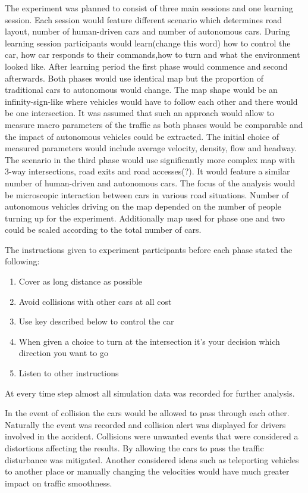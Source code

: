 \documentclass[11pt]{article}
\begin{document}
The experiment was planned to consist of three main sessions and one learning session. Each session would feature different scenario which determines road layout, number of human-driven cars and number of autonomous cars. During learning session participants would learn(change this word) how to control the car, how car responds to their commands,how to turn and what the environment looked like. 
After learning period the first phase would commence and second afterwards. Both phases would use identical map but the proportion of traditional cars to autonomous would change. The map shape would be an infinity-sign-like where vehicles would have to follow each other and there would be one intersection. It was assumed that such an approach would allow to measure macro parameters of the traffic as both phases would be comparable and the impact of autonomous vehicles could be extracted. The initial choice of measured parameters would include average velocity, density, flow and headway. 
The scenario in the third phase would use significantly more complex map with 3-way  intersections, road exits and road accesses(?). It would feature a similar number of human-driven and autonomous cars. The focus of the analysis would be microscopic interaction between cars in various road situations. 
Number of autonomous vehicles driving on the map depended on the number of people turning up for the experiment. Additionally map used for phase one and two could be scaled according to the total number of cars.


The instructions given to experiment participants before each phase stated the following:

\begin{enumerate}
  \item Cover as long distance as possible
  \item Avoid collisions with other cars at all cost
  \item Use key described below to control the car
  \item When given a choice to turn at the intersection it's your decision which direction you want to go
  \item Listen to other instructions
\end{enumerate}


At every time step almost all simulation data was recorded for further analysis. 

In the event of collision the cars would be allowed to pass through each other. Naturally the event was recorded and collision alert was displayed for drivers involved in the accident. Collisions were unwanted events that were considered a distortions affecting the results. By allowing the cars to pass the traffic disturbance was mitigated. Another considered ideas such as teleporting vehicles to another place or manually changing the velocities would have much greater impact on traffic smoothness. 
\end{document}

